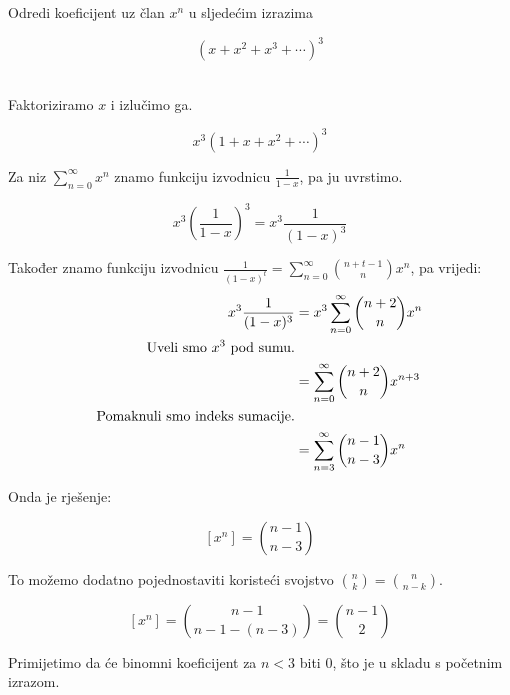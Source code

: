 \documentclass[exam.tex]{subfiles}
\begin{document}
	\begin{subtask}
		Odredi koeficijent uz član \( x^n \) u sljedećim izrazima
	
		\[ (x + x^2 + x^3 + \cdots)^3 \] \\
	\end{subtask}
	
	Faktoriziramo \( x \) i izlučimo ga.
	
	\[ x^3 (1 + x + x^2 + \cdots)^3 \]
	
	Za niz \( \sum\limits^\infty_{n=0} x^n \) znamo funkciju izvodnicu \( \frac{1}{1 - x} \), pa ju uvrstimo.
	
	\[ x^3 \left ( \frac{1}{1 - x} \right )^3 = x^3 \frac{1}{(1 - x)^3} \]
	
	Također znamo funkciju izvodnicu \( \frac{1}{(1 - x)^t} = \sum\limits^\infty_{n=0} \binom{n + t - 1}{n} x^n \), pa vrijedi:
	\begin{align*}
		x^3 \frac{1}{(1 - x)^3} &= x^3 \sum\limits^\infty_{n=0} \binom{n + 2}{n} x^n \\
		\text{Uveli smo \( x^3 \) pod sumu.} \\
		&= \sum\limits^\infty_{n=0} \binom{n + 2}{n} x^{n + 3} \\
		\text{Pomaknuli smo indeks sumacije.} \\
		&= \sum\limits^\infty_{n=3} \binom{n - 1}{n - 3} x^n
	\end{align*}
	
	Onda je rješenje:
	
	\[ [x^n] = \binom{n - 1}{n - 3} \]
	
	To možemo dodatno pojednostaviti koristeći svojstvo \( \binom{n}{k} = \binom{n}{n - k} \).
	
	\[ [x^n] = \binom{n - 1}{n - 1 - (n - 3)} = \binom{n - 1}{2} \]
	
	Primijetimo da će binomni koeficijent za \( n < 3 \) biti 0, što je u skladu s početnim izrazom.
\end{document}

